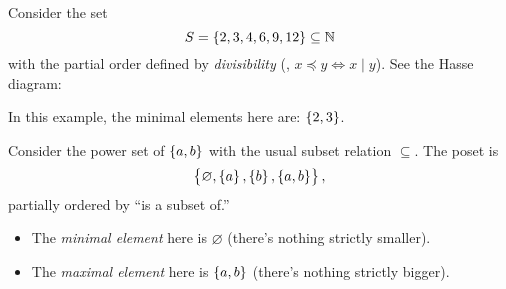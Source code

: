 \documentclass[11pt,openany]{article}
\begin{document}
\begin{example*}
	Consider the set \[
	S=\set{2,3,4,6,9, 12}\subseteq\mathbb{N}
	\] with the partial order defined by \textit{divisibility} (\ie, $x\preceq y\iff x\mid y$). See the Hasse diagram:
	\begin{center}
		\hspace{20pt}
	\end{center}
	In this example, the minimal elements here are: $\set{2,3}$.
\end{example*} 
\begin{example*}
	Consider the power set of $\set{a,b}$ with the usual subset relation $\subseteq$. The poset is \[
	\set{\varnothing,\set{a},\set{b},\set{a,b}},
	\] partially ordered by ``is a subset of.''
	\begin{center}
	\end{center}
	\begin{itemize}
		\item The \textit{minimal element} here is $\varnothing$ (there's nothing strictly smaller).
		\item The \textit{maximal element} here is $\set{a,b}$ (there's nothing strictly bigger).
	\end{itemize}
\end{example*}
\end{document}
